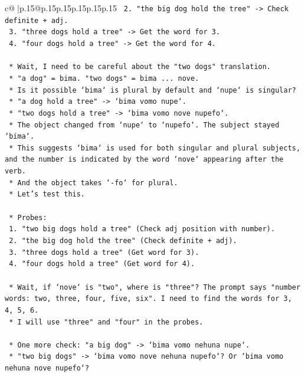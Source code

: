 \documentclass{article}
\begin{document}
{\begin{supertabular}{c@{$\;$}|p{.15\linewidth}@{}p{.15\linewidth}p{.15\linewidth}p{.15\linewidth}p{.15\linewidth}p{.15\linewidth}}
{{{\texttt{        2.  "the big dog hold the tree" {-}> Check definite + adj.} \\
\texttt{        3.  "three dogs hold a tree" {-}> Get the word for 3.} \\
\texttt{        4.  "four dogs hold a tree" {-}> Get the word for 4.} \\
\\ 
\texttt{    *   Wait, I need to be careful about the "two dogs" translation.} \\
\texttt{    *   "a dog" = bima. "two dogs" = bima ... nove.} \\
\texttt{    *   Is it possible `bima` is plural by default and `nupe` is singular?} \\
\texttt{    *   "a dog hold a tree" {-}> `bima vomo nupe`.} \\
\texttt{    *   "two dogs hold a tree" {-}> `bima vomo nove nupefo`.} \\
\texttt{    *   The object changed from `nupe` to `nupefo`. The subject stayed `bima`.} \\
\texttt{    *   This suggests `bima` is used for both singular and plural subjects, and the number is indicated by the word `nove` appearing after the verb.} \\
\texttt{    *   And the object takes `{-}fo` for plural.} \\
\texttt{    *   Let's test this.} \\
\\ 
\texttt{    *   Probes:} \\
\texttt{        1.  "two big dogs hold a tree" (Check adj position with number).} \\
\texttt{        2.  "the big dog hold the tree" (Check definite + adj).} \\
\texttt{        3.  "three dogs hold a tree" (Get word for 3).} \\
\texttt{        4.  "four dogs hold a tree" (Get word for 4).} \\
\\ 
\texttt{    *   Wait, if `nove` is "two", where is "three"? The prompt says "number words: two, three, four, five, six". I need to find the words for 3, 4, 5, 6.} \\
\texttt{    *   I will use "three" and "four" in the probes.} \\
\\ 
\texttt{    *   One more check: "a big dog" {-}> `bima vomo nehuna nupe`.} \\
\texttt{    *   "two big dogs" {-}> `bima vomo nove nehuna nupefo`? Or `bima vomo nehuna nove nupefo`?} \\
}}}
\end{supertabular}}
\end{document}
